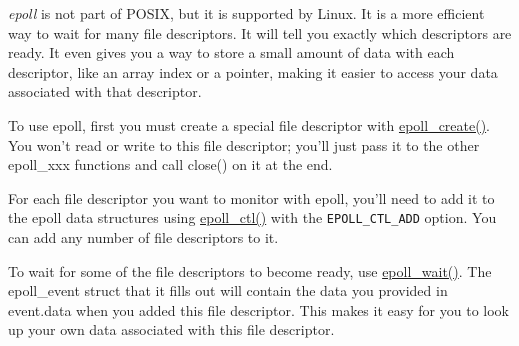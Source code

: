 \emph{epoll} is not part of POSIX, but it is supported by Linux. It is a
more efficient way to wait for many file descriptors. It will tell you
exactly which descriptors are ready. It even gives you a way to store a
small amount of data with each descriptor, like an array index or a
pointer, making it easier to access your data associated with that
descriptor.

To use epoll, first you must create a special file descriptor with
\href{http://linux.die.net/man/2/epoll_create}{epoll\_create()}. You
won't read or write to this file descriptor; you'll just pass it to the
other epoll\_xxx functions and call close() on it at the end.

\begin{Shaded}
\begin{Highlighting}[]
    \NormalTok{);}
\end{Highlighting}
\end{Shaded}

For each file descriptor you want to monitor with epoll, you'll need to
add it to the epoll data structures using
\href{http://linux.die.net/man/2/epoll_ctl}{epoll\_ctl()} with the
\texttt{EPOLL\_CTL\_ADD} option. You can add any number of file
descriptors to it.

\begin{Shaded}
\begin{Highlighting}[]
     
\end{Highlighting}
\end{Shaded}

To wait for some of the file descriptors to become ready, use
\href{http://linux.die.net/man/2/epoll_wait}{epoll\_wait()}. The
epoll\_event struct that it fills out will contain the data you provided
in event.data when you added this file descriptor. This makes it easy
for you to look up your own data associated with this file descriptor.

\begin{Shaded}
\end{Shaded}

